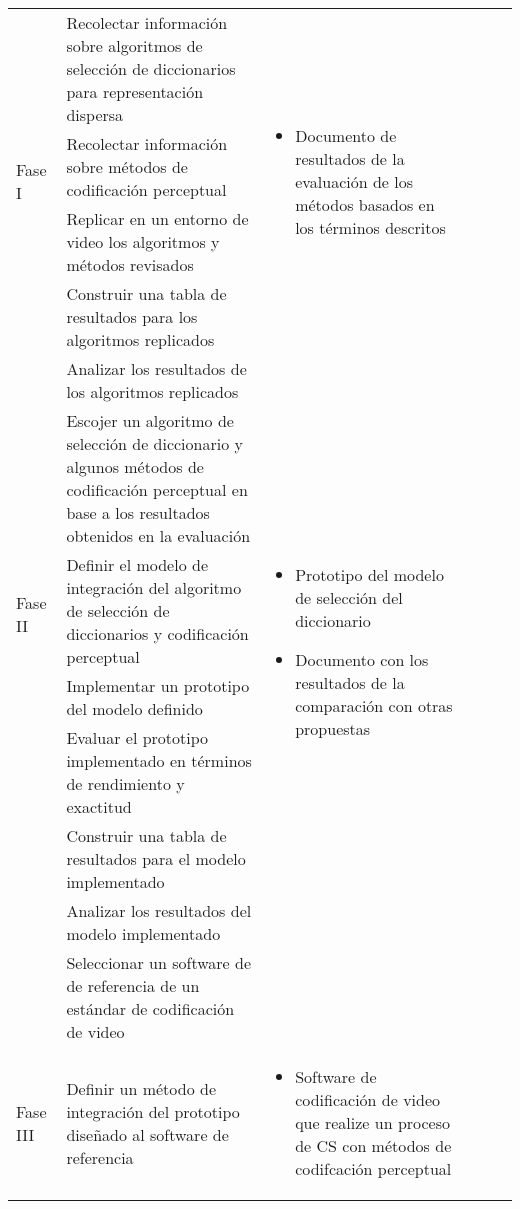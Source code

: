 \begin{longtable}{|p{0.1\linewidth}|m{0.4\linewidth}|p{0.4\linewidth}|p{0.23\linewidth}|}
\multirow{4}{*}{Fase I} & Recolectar informaci\'on sobre algoritmos de selecci\'on de diccionarios para representaci\'on dispersa & \multirow{4}{\linewidth}{
\begin{itemize}[leftmargin=*]
    \item Documento de resultados de la evaluaci\'on de los m\'etodos basados en los t\'erminos descritos
\end{itemize}}\\
\cline{2-2}
  & Recolectar informaci\'on sobre m\'etodos de codificaci\'on perceptual & \\
\cline{2-2}
  & Replicar en un entorno de  video los algoritmos y m\'etodos revisados  & \\
\cline{2-2}
  & Construir una tabla de resultados para los algoritmos replicados & \\
 \cline{2-2}
  & Analizar los resultados de los algoritmos replicados & \\
\hline
\multirow{4}{*}{Fase II} & Escojer un algoritmo de selecci\'on de diccionario y algunos m\'etodos de codificaci\'on perceptual en base a los resultados obtenidos en la evaluaci\'on & \multirow{5}{\linewidth}{
\begin{itemize}[leftmargin=*]
    \item Prototipo del modelo de selecci\'on del diccionario 
    \item Documento con los resultados de la comparaci\'on con otras propuestas
\end{itemize}} \\
\cline{2-2}
  & Definir el modelo de integraci\'on del algoritmo de selecci\'on de diccionarios y codificaci\'on perceptual & \\
\cline{2-2}
  & Implementar un prototipo del modelo definido & \\
 \cline{2-2}
   & Evaluar el prototipo implementado en t\'erminos de rendimiento y exactitud & \\
 \cline{2-2}
   & Construir una tabla de resultados para el modelo implementado & \\
 \cline{2-2}
  & Analizar los resultados del modelo implementado & \\
\hline
 & Seleccionar un software de de referencia de un est\'andar de codificaci\'on de video &  \\
\cline{2-2}
 \multirow{4}{*}{Fase III} & Definir un m\'etodo de integraci\'on del prototipo dise\~nado al software de referencia & \multirow{4}{\linewidth}{
\begin{itemize}[leftmargin=*]
    \item Software de codificaci\'on de video que realize un proceso de CS con m\'etodos de codifcaci\'on perceptual

\end{itemize}}
\end{longtable}
